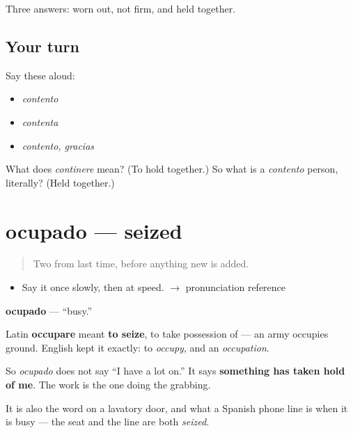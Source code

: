 \begin{grammarlens}[title={What you've built}]
Three answers: worn out, not firm, and held together.
\end{grammarlens}

\subsection*{Your turn}
Say these aloud:

\begin{itemize}
\raggedright
  \item \emph{contento}
  \item \emph{contenta}
  \item \emph{contento, gracias}
\end{itemize}

\begin{tcolorbox}[breakable,colback=teal!4,colframe=teal!35!black,title={Before you move on}]
What does \emph{continere} mean? (To hold together.) So what is a \emph{contento} person, literally? (Held together.)
\end{tcolorbox}
\section[ocupado]{ocupado — seized}

\label{lesson:ES-C304-ocupado}



\begin{quote}
Two from last time, before anything new is added.
\end{quote}

\begin{sounds}
\begin{itemize}
\raggedright
  \item Say it once slowly, then at speed. $\to$ pronunciation reference
\end{itemize}
\end{sounds}

\begin{cousinweb}
\textbf{ocupado} — \textquotedblleft{}busy.\textquotedblright{}

Latin \textbf{occupare} meant \textbf{to seize}, to take possession of — an army occupies ground. English kept it exactly: to \emph{occupy}, and an \emph{occupation}.

So \emph{ocupado} does not say \textquotedblleft{}I have a lot on.\textquotedblright{} It says \textbf{something has taken hold of me}. The work is the one doing the grabbing.

It is also the word on a lavatory door, and what a Spanish phone line is when it is busy — the seat and the line are both \emph{seized}.
\end{cousinweb}

